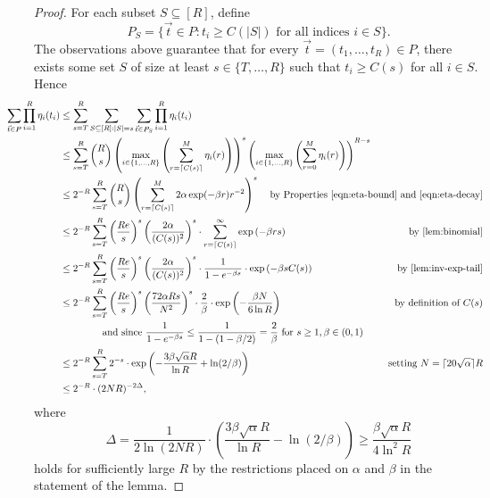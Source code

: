 \documentclass[11pt, letterpaper, fleqn]{article}
\theoremstyle{plain}
\begin{document}
\begin{proof}
For each subset $S \subseteq [R]$, define
\[P_S = \{\vec{t} \in P : t_i \ge C(|S|)\text{ for all indices }i \in S\}.\]
The observations above guarantee that for every $\vec{t}=(t_1, \dots, t_R) \in P$, 
there exists some set $S$ of size at least $s \in \{T, \dots, R\}$ such that 
$t_i \geq C(s)$ for all $i \in S$. Hence
\begin{align*} \hspace{-10mm}
\sum_{\vec{t} \in P} \prod_{i = 1}^R \eta_i(t_i)  & \leq \sum_{s = T}^{R} \sum_{S \subseteq [R] : |S| = s} \sum_{\vec{t} \in P_S} \prod_{i = 1}^R \eta_i(t_i) \\
& \leq \sum_{s = T}^{R} \binom{R}{s} \left( \max_{i \in \{1, \dots, R\}} \left( \sum_{r=\lceil C(s) \rceil}^M \eta_i(r)\right) \right)^s  \left( \max_{i \in \{1, \dots, R\}} \left( \sum_{r = 0}^M \eta_i(r) \right)\right)^{R-s} \hspace{-3.3em}&\hspace{-3em}\\
&\leq  2^{-R}\sum_{s = T}^{R} \binom{R}{s} \left( \sum_{r = \lceil C(s) \rceil}^M 2\alpha \exp(-\beta r ) r^{-2} \right)^s & \hspace{-28mm} \text{by Properties } \eqref{eqn:eta-bound} \text{ and } \eqref{eqn:eta-decay}\\
&\le 2^{-R} \sum_{s = T}^{R} \left( \frac{Re}{s} \right)^s \left(\frac{2\alpha}{(C(s))^2} \right)^{s} \cdot \sum_{r = \lceil C(s) \rceil}^\infty \exp\left(-\beta r s\right) & \hspace{-28mm} \text{by \Cref{lem:binomial}}\\
&\le 2^{-R} \sum_{s = T}^{R} \left( \frac{Re}{s} \right)^s \left(\frac{2\alpha}{(C(s))^2} \right)^{s} \cdot \frac{1}{1 - e^{-\beta s}} \cdot  \exp\left(-\beta s C(s)\right) & \hspace{-28mm} \text{by \Cref{lem:inv-exp-tail}}\\
&\le 2^{-R} \sum_{s = T}^{R} \left( \frac{Re}{s} \right)^s \left(\frac{72\alpha R s}{N^2} \right)^{s} \cdot \frac{2}{\beta} \cdot  \exp\left(-\frac{\beta N}{6\ln R}\right) & \text{by definition of $C(s)$}\\
&\qquad\qquad\text{ and since } \frac{1}{1 - e^{-\beta s}} \le \frac{1}{1 - (1-\beta/2)} = \frac{2}{\beta} \text{ for } s \ge 1, \beta \in (0, 1) \hspace{-10em}&\hspace{-10em} \\
&\le 2^{-R}  \sum_{s = T}^{R} 2^{-s} \cdot \exp\left(-\frac{3 \beta \sqrt{\alpha} R }{ \ln R} + \ln(2/\beta)\right)&\hspace{-28mm}\text{setting } N = \lceil 20 \sqrt{\alpha}\rceil R \\
&\le 2^{-R} \cdot (2 N R)^{-2\Delta},
\end{align*}
where
\[\Delta = \frac{1}{2\ln(2NR)} \cdot \left(\frac{3\beta \sqrt{\alpha} R}{\ln R} - \ln(2/\beta) \right) \ge \frac{\beta \sqrt{\alpha} R}{4\ln^2 R}\]
holds for sufficiently large $R$ by the restrictions placed on $\alpha$ and $\beta$ in the statement of the lemma.
\end{proof}
\end{document}
